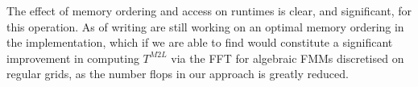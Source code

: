 The effect of memory ordering and access on runtimes is clear, and significant, for this operation. As of writing are still working on an optimal memory ordering in the implementation, which if we are able to find would constitute a significant improvement in computing $T^{M2L}$ via the FFT for algebraic FMMs discretised on regular grids, as the number flops in our approach is greatly reduced.
